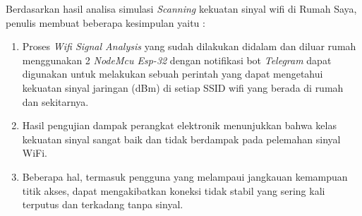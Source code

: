 \documentclass[conference]{IEEEtran}
\begin{document}
Berdasarkan hasil analisa simulasi \textit{Scanning} kekuatan sinyal wifi di Rumah Saya, penulis membuat beberapa kesimpulan yaitu :
\begin{enumerate}
    \item Proses \textit{Wifi Signal Analysis} yang sudah dilakukan didalam dan diluar rumah  menggunakan 2 \textit{NodeMcu Esp-32} dengan notifikasi bot \textit{Telegram} dapat digunakan untuk melakukan sebuah perintah yang dapat mengetahui kekuatan sinyal jaringan (dBm)
    di setiap SSID wifi yang berada di rumah dan sekitarnya.
    \item Hasil pengujian dampak perangkat elektronik menunjukkan bahwa kelas kekuatan sinyal sangat baik dan tidak berdampak pada pelemahan sinyal WiFi.
   \item Beberapa hal, termasuk pengguna yang melampaui jangkauan kemampuan titik akses, dapat mengakibatkan koneksi tidak stabil yang sering kali terputus dan terkadang tanpa sinyal.
\end{enumerate}
\end{document}
